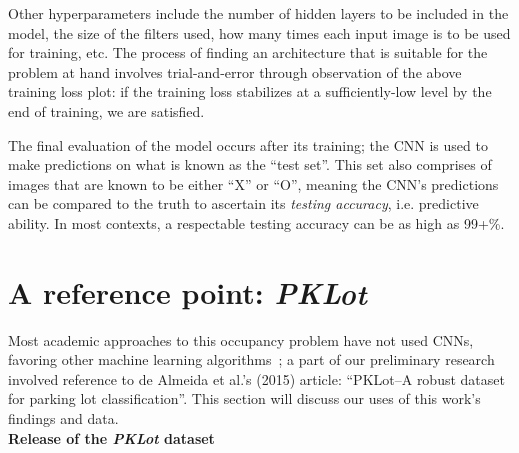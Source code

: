 \documentclass[a4paper, 11pt]{article} %
\begin{document}
	Other hyperparameters include the number of hidden layers to be included in the model, the size of 
	the filters used, how many times each input image is to be used for training, etc. The process of 
	finding an architecture that is suitable for the problem at hand involves trial-and-error through 
	observation of the above training loss plot: if the training loss stabilizes at a sufficiently-low 
	level by the end of training, we are satisfied.
	
	The final evaluation of the model occurs after its training; the CNN is used to make predictions on 
	what is known as the ``test set''. This set also comprises of images that are known to be either ``X'' 
	or ``O'', meaning the CNN's predictions can be compared to the truth to ascertain its 
	\textit{testing accuracy}, i.e. predictive ability. In most contexts, a respectable testing accuracy can 
	be as high as 99+\%.
 
\section{A reference point: \textit{PKLot}}
    Most academic approaches to this occupancy problem have not used CNNs, favoring other machine 
    learning algorithms~\cite{quickspot-paper}\relax; a part of our preliminary research involved 
    reference to de Almeida et al.'s (2015) article: ``PKLot--A robust dataset for parking lot 
    classification''. This section will discuss our uses of this work's findings and data. \\
    \textbf{Release of the \textit{PKLot} dataset}
    
\end{document}
